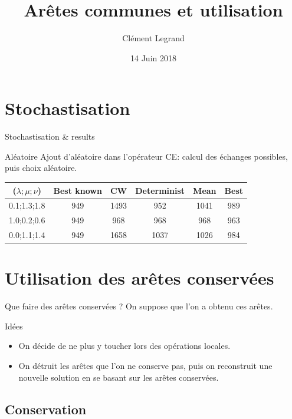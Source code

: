 \documentclass{beamer}
\title{Arêtes communes et utilisation}
\author{Clément Legrand}
\date{14 Juin 2018}
\begin{document}
\begin{frame}[plain]
\titlepage
\end{frame}

\section{Stochastisation}

\begin{frame}{Stochastisation \& results}
\begin{block}{Aléatoire}
Ajout d'aléatoire dans l'opérateur CE: calcul des échanges possibles, puis choix aléatoire.
\end{block}

\centering
\begin{tabular}{|c||c||c||c||c|c|}
   \hline
   ($\lambda;\mu;\nu$) & Best known & CW & Determinist & Mean & Best \\
   \hline
   0.1;1.3;1.8 & 949 & 1493 & 952 & 1041 & 989 \\
   \hline
   1.0;0.2;0.6 & 949 & 968 & 968 & 968 & 963 \\
   \hline
   0.0;1.1;1.4 & 949 & 1658 & 1037 & 1026 & 984 \\
   \hline
\end{tabular}

\end{frame}

\section{Utilisation des arêtes conservées}
\begin{frame}{Que faire des arêtes conservées ?}
On suppose que l'on a obtenu ces arêtes.
\begin{exampleblock}{Idées}
\begin{itemize}
\item On décide de ne plus y toucher lors des opérations locales.
\item On détruit les arêtes que l'on ne conserve pas, puis on reconstruit une nouvelle solution en se basant sur les arêtes conservées.
\end{itemize}
\end{exampleblock}

\end{frame}

\subsection{Conservation}
\end{document}
